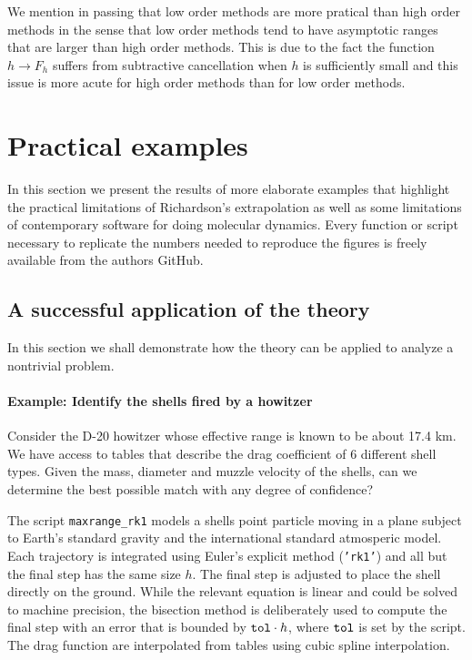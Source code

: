 \documentclass[runningheads]{llncs}
\begin{document}
We mention in passing that low order methods are more pratical than high order methods in the sense that low order methods tend to have asymptotic ranges that are larger than high order methods.
This is due to the fact the function $h \rightarrow F_h$ suffers from subtractive cancellation when $h$ is sufficiently small and this issue is more acute for high order methods than for low order methods.


\section{Practical examples}

In this section we present the results of more elaborate examples that highlight the practical limitations of Richardson's extrapolation as well as some limitations of contemporary software for doing molecular dynamics. Every function or script necessary to replicate the numbers needed to reproduce the figures is freely available from the authors GitHub.

\subsection{A successful application of the theory}

In this section we shall demonstrate how the theory can be applied to analyze a nontrivial problem.

\paragraph{Example: Identify the shells fired by a howitzer}

Consider the D-20 howitzer whose effective range is known to be about 17.4 km. We have access to tables that describe the drag coefficient of 6 different shell types. Given the mass, diameter and muzzle velocity of the shells, can we determine the best possible match with any degree of confidence?

The script {\tt maxrange\_rk1} models a shells point particle moving in a plane subject to Earth's standard gravity and the international standard atmosperic model. Each trajectory is integrated using Euler's explicit method ({\tt 'rk1'}) and all but the final step has the same size $h$. The final step is adjusted to place the shell directly on the ground. While the relevant equation is linear and could be solved to machine precision, the bisection method is deliberately used to compute the final step with an error that is bounded by ${\tt tol} \cdot h$, where ${\tt tol}$ is set by the script. The drag function are interpolated from tables using cubic spline interpolation.
\end{document}
